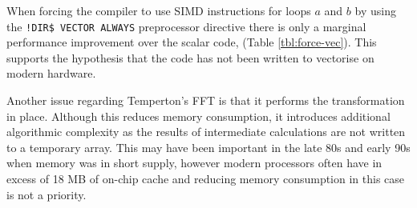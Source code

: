 \documentclass[a4paper,11pt]{report}
\begin{document}
\par
When forcing the compiler to use SIMD instructions for loops $a$ and $b$ by using the \texttt{!DIR\$ VECTOR ALWAYS} preprocessor directive there is only a marginal performance improvement over the scalar code, (Table \ref{tbl:force-vec}). This supports the hypothesis that the code has not been written to vectorise on modern hardware. 
\par
Another issue regarding Temperton's FFT is that it performs the transformation in place. Although this reduces memory consumption, it introduces additional algorithmic complexity as the results of intermediate calculations are not written to a temporary array. This may have been important in the late 80s and early 90s when memory was in short supply, however modern processors often have in excess of 18 MB of on-chip cache and reducing memory consumption in this case is not a priority. 


\end{document}
